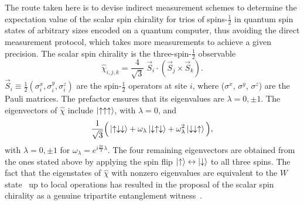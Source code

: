 \documentclass[aps,prl,twocolumn]{revtex4}
\begin{document}
The route taken here is to devise indirect measurement schemes to determine the expectation value of the scalar spin chirality for trios of spins-$\frac{1}{2}$ in quantum spin states of arbitrary sizes encoded on a quantum computer, thus avoiding the direct measurement protocol, which takes more measurements to achieve a given precision. The scalar spin chirality is the three-spin-$\frac{1}{2}$ observable~\cite{wen1989}
\begin{equation}
    \hat{\chi}_{i,j,k} = \frac{4}{\sqrt 3} \; \vec{S}_i\cdot\left(\vec{S}_j\times\vec{S}_k\right).
    \label{eq:chirality}
\end{equation}
$\vec{S}_i \equiv \frac{1}{2}(\sigma^{x}_{i}, \sigma^{y}_{i}, \sigma^{z}_{i})$ are the spin-$\frac{1}{2}$ operators at site $i$, where ($\sigma^x$, $\sigma^y$, $\sigma^z$) are the Pauli matrices. %
The prefactor ensures that its eigenvalues are $\lambda = 0, \pm 1$. %
The eigenvectors of $\hat{\chi}$ include $\ket{\uparrow \uparrow \uparrow}$, with $\lambda = 0$, and 
\begin{eqnarray}
    \frac{1}{\sqrt{3}} \Big( \ket{\uparrow \downarrow \downarrow} + \omega_{\lambda} \ket{\downarrow \uparrow \downarrow} + \omega_{\lambda}^2  \ket{\downarrow \downarrow \uparrow} \Big),
\label{eq:pm1}
\end{eqnarray}
with $\lambda=0,\pm 1$ for $\omega_{\lambda} = e^{i\frac{2\pi}{3}\lambda}$. The four remaining eigenvectors are obtained from the ones stated above by applying the spin flip $\ket{\uparrow} \leftrightarrow \ket{\downarrow}$ to all three spins. The fact that the eigenstates of $\hat{\chi}$ with nonzero eigenvalues are equivalent to the $W$ state~\cite{Cruz19} up to local operations has resulted in the proposal of the scalar spin chirality as a genuine tripartite entanglement witness~\cite{tsomokos08}. 

\end{document}
